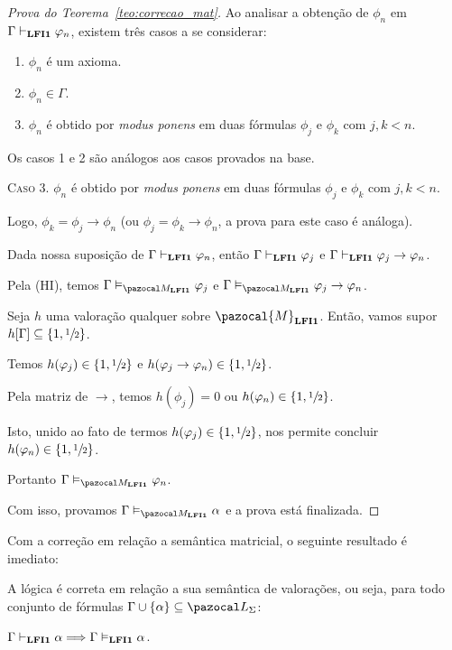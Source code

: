 \begin{proof}[Prova do Teorema~\ref{teo:correcao_mat}]
         Ao analisar a obtenção de $\phi_{n}$ em $\Gamma \vdash_{{\normalfont\textbf{LFI1}}{}} \varphi_{n}$, existem três casos a se considerar:
         
         \begin{enumerate}
            \item $\phi_{n}$ é um axioma.
            \item $\phi_{n} \in \Gamma$.
            \item $\phi_{n}$ é obtido por \textit{modus ponens} em duas fórmulas $\phi_{j}$ e $\phi_{k}$ com $j, k < n$. 
         \end{enumerate}
         
         Os casos 1 e 2 são análogos aos casos provados na base.
         
         \noindent \textsc{Caso 3.} $\phi_{n}$ é obtido por \textit{modus ponens} em duas fórmulas $\phi_{j}$ e $\phi_{k}$ com $j, k < n$. 
         
         Logo, $\phi_{k} = \phi_{j} \to \phi_{n}$ (ou $\phi_{j} = \phi_{k} \to \phi_{n}$, a prova para este caso é análoga). 
         
         Dada nossa suposição de $\Gamma \vdash_{{\normalfont\textbf{LFI1}}{}} \varphi_{n}$, então $\Gamma \vdash_{{\normalfont\textbf{LFI1}}{}} \varphi_{j}$ e $\Gamma \vdash_{{\normalfont\textbf{LFI1}}{}} \varphi_{j} \to \varphi_{n}$. 
         
         Pela (HI), temos $\Gamma \conmat \phi_{j}$ e $\Gamma \conmat \phi_{j} \to \phi_{n}$.

         Seja $h$ uma valoração qualquer sobre $\pazocal{M}_{\lfium{}}$. Então, vamos supor $h[\Gamma] \subseteq \{1, \sfrac{1}{2}{}\}$. 
         
         Temos $h(\varphi_{j}) \in \{1, \sfrac{1}{2}{}\}$ e $h(\varphi_{j} \to \varphi_{n}) \in \{1,\sfrac{1}{2}{}\}$. 
         
         Pela matriz de $\to$, temos $h(\phi_{j}) = 0$ ou $h(\varphi_{n}) \in \{1,\sfrac{1}{2}{}\}$. 
         
         Isto, unido ao fato de termos $h(\varphi_{j}) \in \{1,\sfrac{1}{2}{}\}$, nos permite concluir $h(\varphi_{n}) \in \{1,\sfrac{1}{2}{}\}$. 
         
         Portanto $\Gamma \conmat \phi_{n}$.

         \noindent Com isso, provamos $\Gamma \conmat \alpha$ e a prova está finalizada.

    \end{proof}

    Com a correção em relação a semântica matricial, o seguinte resultado é imediato:


    \begin{corolario}\label{cor:correcao_val}
        A lógica {\normalfont\lfium{}} é correta em relação a sua semântica de valorações, ou seja, para todo conjunto de fórmulas $\Gamma \cup \{\alpha\} \subseteq \ling{}$:

        \centering
        {\normalfont{} $\Gamma \vdash_{{\normalfont\textbf{LFI1}}{}} \alpha \Longrightarrow \Gamma \vDash_{{\normalfont\textbf{LFI1}}{}} \alpha$.}
    \end{corolario}

